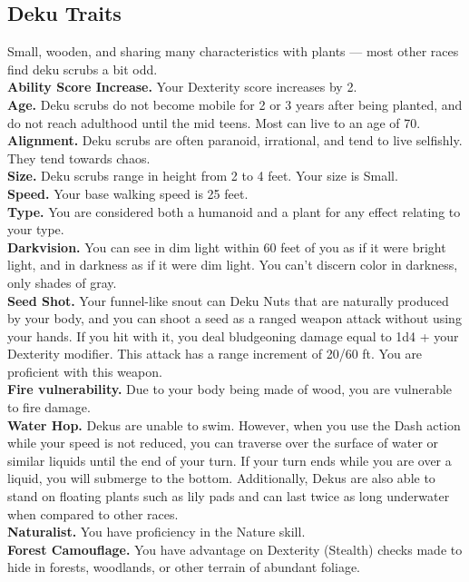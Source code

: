 \documentclass[10pt,twoside,twocolumn,openany]{book}
\begin{document}
\subsection{Deku Traits}
Small, wooden, and sharing many characteristics with plants — most other races find deku scrubs a bit odd.\\
\indent \textbf{Ability Score Increase.} Your Dexterity score increases by 2.\\
\indent \textbf{Age.} Deku scrubs do not become mobile for 2 or 3 years after being planted, and do not reach adulthood until the mid teens. Most can live to an age of 70.\\
\indent \textbf{Alignment.} Deku scrubs are often paranoid, irrational, and tend to live selfishly. They tend towards chaos. \\
\indent \textbf{Size.} Deku scrubs range in height from 2 to 4 feet. Your size is Small.\\
\indent \textbf{Speed.} Your base walking speed is 25 feet.\\
\indent \textbf{Type.} You are considered both a humanoid and a plant for any effect relating to your type.\\
\indent \textbf{Darkvision.} You can see in dim light within 60 feet of you as if it were bright light, and in darkness as if it were dim light. You can't discern color in darkness, only shades of gray.\\
\indent \textbf{Seed Shot.} Your funnel-like snout can Deku Nuts that are naturally produced by your body, and you can shoot a seed as a ranged weapon attack without using your hands. If you hit with it, you deal bludgeoning damage equal to 1d4 + your Dexterity modifier. This attack has a range increment of 20/60 ft. You are proficient with this weapon.\\
\indent \textbf{Fire vulnerability.} Due to your body being made of wood, you are vulnerable to fire damage.\\
\indent \textbf{Water Hop.} Dekus are unable to swim. However, when you use the Dash action while your speed is not reduced, you can traverse over the surface of water or similar liquids until the end of your turn. If your turn ends while you are over a liquid, you will submerge to the bottom. Additionally, Dekus are also able to stand on floating plants such as lily pads and can last twice as long underwater when compared to other races.\\
\indent \textbf{Naturalist.} You have proficiency in the Nature skill.\\
\indent \textbf{Forest Camouflage.} You have advantage on Dexterity (Stealth) checks made to hide in forests, woodlands, or other terrain of abundant foliage.\\
\end{document}
